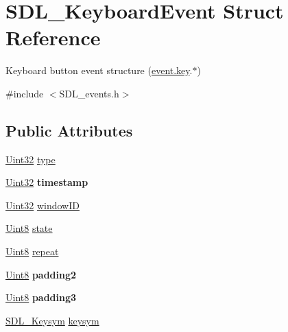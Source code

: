 \hypertarget{struct_s_d_l___keyboard_event}{}\section{S\+D\+L\+\_\+\+Keyboard\+Event Struct Reference}
\label{struct_s_d_l___keyboard_event}


Keyboard button event structure (\hyperlink{union_s_d_l___event_ab99927835cc77a9b6bb50b419b4a27df}{event.\+key}.$\ast$)  




{\ttfamily \#include $<$S\+D\+L\+\_\+events.\+h$>$}

\subsection*{Public Attributes}
\begin{DoxyCompactItemize}
\item 
\hyperlink{_s_d_l__stdinc_8h_add440eff171ea5f55cb00c4a9ab8672d}{Uint32} \hyperlink{struct_s_d_l___keyboard_event_ae0b2f2aace6f80c1f47e5a14350d409a}{type}
\item 
\hypertarget{struct_s_d_l___keyboard_event_a3da1d8f6892e7f6ee28d9eafdb5e7d02}{}\hyperlink{_s_d_l__stdinc_8h_add440eff171ea5f55cb00c4a9ab8672d}{Uint32} {\bfseries timestamp}\label{struct_s_d_l___keyboard_event_a3da1d8f6892e7f6ee28d9eafdb5e7d02}

\item 
\hyperlink{_s_d_l__stdinc_8h_add440eff171ea5f55cb00c4a9ab8672d}{Uint32} \hyperlink{struct_s_d_l___keyboard_event_a56efb6780b96acd5b50d8f797efb3546}{window\+I\+D}
\item 
\hyperlink{_s_d_l__stdinc_8h_a2944638813a090aa23e62f4da842c3e2}{Uint8} \hyperlink{struct_s_d_l___keyboard_event_a110558eb96c113c86cfa31a7018c2346}{state}
\item 
\hyperlink{_s_d_l__stdinc_8h_a2944638813a090aa23e62f4da842c3e2}{Uint8} \hyperlink{struct_s_d_l___keyboard_event_a3edac3b36304812d533795c9df4ed4c1}{repeat}
\item 
\hypertarget{struct_s_d_l___keyboard_event_ae270122f757f76171318294afd2c95e6}{}\hyperlink{_s_d_l__stdinc_8h_a2944638813a090aa23e62f4da842c3e2}{Uint8} {\bfseries padding2}\label{struct_s_d_l___keyboard_event_ae270122f757f76171318294afd2c95e6}

\item 
\hypertarget{struct_s_d_l___keyboard_event_ae1831035ef556a7b09efcd2469f26f7a}{}\hyperlink{_s_d_l__stdinc_8h_a2944638813a090aa23e62f4da842c3e2}{Uint8} {\bfseries padding3}\label{struct_s_d_l___keyboard_event_ae1831035ef556a7b09efcd2469f26f7a}

\item 
\hyperlink{struct_s_d_l___keysym}{S\+D\+L\+\_\+\+Keysym} \hyperlink{struct_s_d_l___keyboard_event_a2a57ba820a298f2c02ad5d41fd2b1aa8}{keysym}
\end{DoxyCompactItemize}


